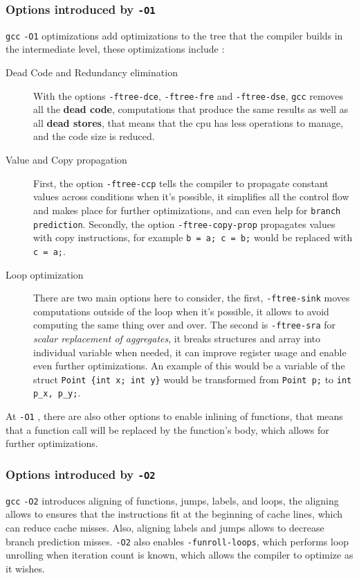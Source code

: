 \documentclass{rapport}
\newcommand{\gcc}{\texttt{gcc} }
\newcommand{\optione}{\texttt{-O1} }
\newcommand{\optitwo}{\texttt{-O2} }
\begin{document}
\subsubsection{Options introduced by \optione}
\gcc \optione optimizations add optimizations to the tree that the compiler builds in the intermediate level, these optimizations include :
\newline
\begin{description}
    \item[Dead Code and Redundancy elimination] With the options \texttt{-ftree-dce}, \texttt{-ftree-fre} and \texttt{-ftree-dse}, \gcc removes all the \textbf{dead code}, computations that produce the same results as well as all \textbf{dead stores}, that means that the cpu has less operations to manage, and the code size is reduced.
    
    \item[Value and Copy propagation] First, the option \texttt{-ftree-ccp} tells the compiler to propagate constant values across conditions when it's possible, it simplifies all the control flow and makes place for further optimizations, and can even help for \texttt{branch prediction}. \newline Secondly, the option \texttt{-ftree-copy-prop} propagates values with copy instructions, for example \texttt{b = a; c = b;} would be replaced with \texttt{c = a;}.
    
    \item[Loop optimization] There are two main options here to consider, the first, \texttt{-ftree-sink} moves computations outside of the loop when it's possible, it allows to avoid computing the same thing over and over. \newline
    The second is \texttt{-ftree-sra} for \textit{scalar replacement of aggregates}, it breaks structures and array into individual variable when needed, it can improve register usage and enable even further optimizations. An example of this would be a variable of the struct \texttt{Point \{int x; int y\}} would be transformed from \texttt{Point p;} to \texttt{int p\_x, p\_y;}.
\end{description}
At \optione, there are also other options to enable inlining of functions, that means that a function call will be replaced by the function's body, which allows for further optimizations.


\subsubsection{Options introduced by \optitwo}
\gcc \optitwo introduces aligning of functions, jumps, labels, and loops, the aligning allows to ensures that the instructions fit at the beginning of cache lines, which can reduce cache misses. Also, aligning labels and jumps allows to decrease branch prediction misses.
\newline
\optitwo also enables \texttt{-funroll-loops}, which performs loop unrolling when iteration count is known, which allows the compiler to optimize as it wishes.
\end{document}
